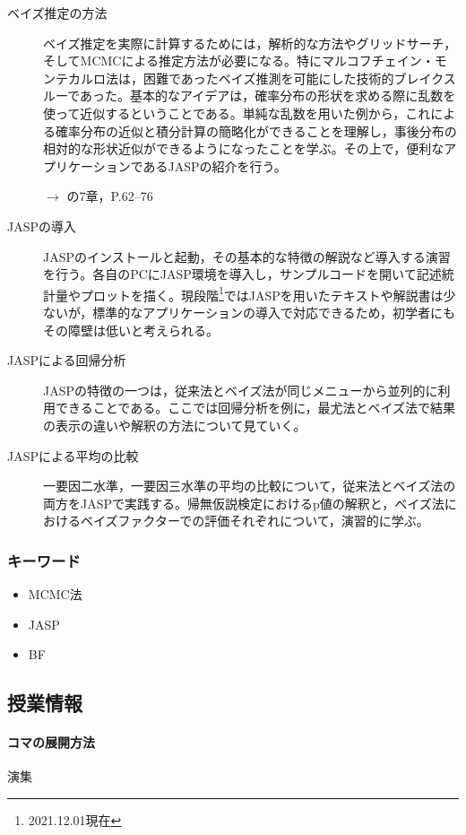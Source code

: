 \begin{description}
\item[ベイズ推定の方法] ベイズ推定を実際に計算するためには，解析的な方法やグリッドサーチ，そしてMCMCによる推定方法が必要になる。特にマルコフチェイン・モンテカルロ法は，困難であったベイズ推測を可能にした技術的ブレイクスルーであった。基本的なアイデアは，確率分布の形状を求める際に乱数を使って近似するということである。単純な乱数を用いた例から，これによる確率分布の近似と積分計算の簡略化ができることを理解し，事後分布の相対的な形状近似ができるようになったことを学ぶ。その上で，便利なアプリケーションであるJASPの紹介を行う。
\begin{flushright}
    $\to$ \citet{Maeda2017}の7章，\citet{馬場201907}P.62--76
\end{flushright} 
\item[JASPの導入] JASPのインストールと起動，その基本的な特徴の解説など導入する演習を行う。各自のPCにJASP環境を導入し，サンプルコードを開いて記述統計量やプロットを描く。現段階\footnote{2021.12.01現在}ではJASPを用いたテキストや解説書は少ないが，標準的なアプリケーションの導入で対応できるため，初学者にもその障壁は低いと考えられる。
\item[JASPによる回帰分析] JASPの特徴の一つは，従来法とベイズ法が同じメニューから並列的に利用できることである。ここでは回帰分析を例に，最尤法とベイズ法で結果の表示の違いや解釈の方法について見ていく。
\item[JASPによる平均の比較] 一要因二水準，一要因三水準の平均の比較について，従来法とベイズ法の両方をJASPで実践する。帰無仮説検定におけるp値の解釈と，ベイズ法におけるベイズファクターでの評価それぞれについて，演習的に学ぶ。

\end{description}
\subsubsection{キーワード}
\begin{itemize}
    \item MCMC法
    \item JASP
    \item BF
\end{itemize}
\subsection{授業情報}
\paragraph{コマの展開方法}
演集

